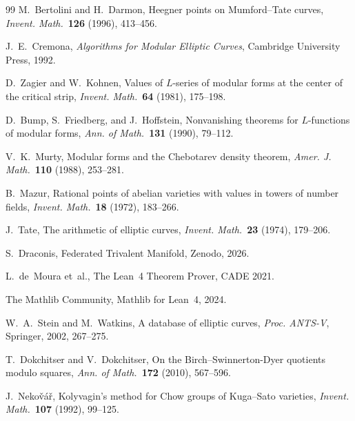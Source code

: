 \documentclass[12pt]{article}
\theoremstyle{plain}
\theoremstyle{definition}
\begin{document}
\begin{thebibliography}{99}
M.~Bertolini and H.~Darmon,
Heegner points on Mumford--Tate curves,
\emph{Invent. Math.}\ \textbf{126} (1996), 413--456.

J.~E.~Cremona,
\emph{Algorithms for Modular Elliptic Curves},
Cambridge University Press, 1992.

D.~Zagier and W.~Kohnen,
Values of $L$-series of modular forms at the center of the critical
strip,
\emph{Invent. Math.}\ \textbf{64} (1981), 175--198.

D.~Bump, S.~Friedberg, and J.~Hoffstein,
Nonvanishing theorems for $L$-functions of modular forms,
\emph{Ann. of Math.}\ \textbf{131} (1990), 79--112.

V.~K.~Murty,
Modular forms and the Chebotarev density theorem,
\emph{Amer. J. Math.}\ \textbf{110} (1988), 253--281.

B.~Mazur,
Rational points of abelian varieties with values in towers of number
fields,
\emph{Invent. Math.}\ \textbf{18} (1972), 183--266.

J.~Tate,
The arithmetic of elliptic curves,
\emph{Invent. Math.}\ \textbf{23} (1974), 179--206.

S.~Draconis, Federated Trivalent Manifold, Zenodo, 2026.

L.~de~Moura et~al., The Lean~4 Theorem Prover, CADE 2021.

The Mathlib Community, Mathlib for Lean~4, 2024.

W.~A.~Stein and M.~Watkins,
A database of elliptic curves,
\emph{Proc. ANTS-V}, Springer, 2002, 267--275.

T.~Dokchitser and V.~Dokchitser,
On the Birch--Swinnerton-Dyer quotients modulo squares,
\emph{Ann. of Math.}\ \textbf{172} (2010), 567--596.

J.~Neko\v{v}\'a\v{r},
Kolyvagin's method for Chow groups of Kuga--Sato varieties,
\emph{Invent. Math.}\ \textbf{107} (1992), 99--125.

\end{thebibliography}
\end{document}
